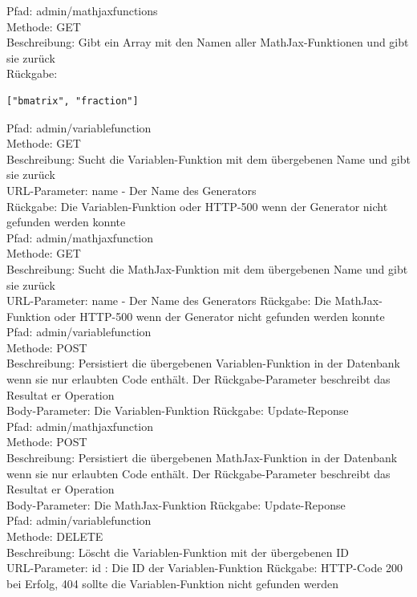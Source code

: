 \noindent Pfad: admin/mathjaxfunctions \\
Methode: GET \\
Beschreibung: Gibt ein Array mit den Namen aller MathJax-Funktionen und gibt sie zurück \\
Rückgabe: \begin{lstlisting} 
["bmatrix", "fraction"]
\end{lstlisting}

\noindent Pfad: admin/variablefunction \\
Methode: GET \\
Beschreibung: Sucht die Variablen-Funktion mit dem übergebenen Name und gibt sie zurück \\
URL-Parameter: name - Der Name des Generators \\
Rückgabe: Die Variablen-Funktion oder HTTP-500 wenn der Generator nicht gefunden werden konnte \\

\noindent Pfad: admin/mathjaxfunction \\
Methode: GET \\
Beschreibung: Sucht die MathJax-Funktion mit dem übergebenen Name und gibt sie zurück \\
URL-Parameter: name - Der Name des Generators
Rückgabe: Die MathJax-Funktion oder HTTP-500 wenn der Generator nicht gefunden werden konnte \\

\noindent Pfad: admin/variablefunction \\
Methode: POST \\
Beschreibung: Persistiert die übergebenen Variablen-Funktion in der Datenbank wenn sie nur erlaubten Code enthält. Der Rückgabe-Parameter beschreibt das Resultat er Operation \\
Body-Parameter: Die Variablen-Funktion
Rückgabe: Update-Reponse \\

\noindent Pfad: admin/mathjaxfunction \\
Methode: POST \\
Beschreibung: Persistiert die übergebenen MathJax-Funktion in der Datenbank wenn sie nur erlaubten Code enthält. Der Rückgabe-Parameter beschreibt das Resultat er Operation \\
Body-Parameter: Die MathJax-Funktion
Rückgabe: Update-Reponse \\

\noindent Pfad: admin/variablefunction \\
Methode: DELETE \\
Beschreibung: Löscht die Variablen-Funktion mit der übergebenen ID \\
URL-Parameter: id : Die ID der Variablen-Funktion
Rückgabe: HTTP-Code 200 bei Erfolg, 404 sollte die Variablen-Funktion nicht gefunden werden \\

